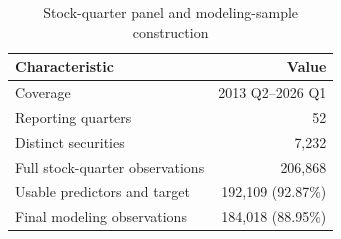 \begin{table}[H]
    \centering
    \caption{Stock-quarter panel and modeling-sample construction}
    \label{tab:sample_construction}
    \begin{tabular}{lr}
        \toprule
        Characteristic & Value \\
        \midrule
        Coverage & 2013 Q2--2026 Q1 \\
        Reporting quarters & 52 \\
        Distinct securities & 7,232 \\
        Full stock-quarter observations & 206,868 \\
        Usable predictors and target & 192,109 (92.87\%) \\
        Final modeling observations & 184,018 (88.95\%) \\
        \bottomrule
    \end{tabular}
\end{table}
